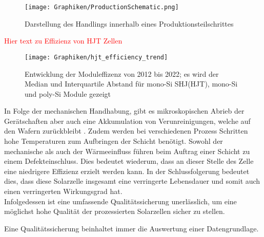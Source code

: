  
 \begin{figure}[h!]
     \centering
     \texttt{[image: Graphiken/ProductionSchematic.png]}
     \caption{Darstellung des Handlings innerhalb eines Produktionsteilschrittes }
     \label{fig:prodSchematic}
 \end{figure}

\textcolor{red}{Hier text zu Effizienz von HJT Zellen}

\begin{figure}[h!]
	\centering
	\texttt{[image: Graphiken/hjt\_efficiency\_trend]}
	\caption{Entwicklung der Moduleffizenz von 2012 bis 2022; es wird der Median und Interquartile Abstand für mono-Si SHJ(HJT), mono-Si und poly-Si Module gezeigt \cite{hjttrendKräling2022}}
	\label{fig:hjtefficiencytrend}
\end{figure}

In Folge der mechanischen Handhabung, gibt es mikroskopischen Abrieb der Gerätschaften aber auch eine Akkumulation von Verunreinigungen, welche auf den Wafern zurückbleibt\cite{Fischer.2019} \cite{Fischer.2022} \cite{particle_image_Fischer2019}. Zudem werden bei verschiedenen Prozess Schritten hohe Temperaturen zum Aufbringen der Schicht benötigt. Sowohl der mechanische als auch der Wärmeeinfluss führen beim Auftrag einer Schicht zu einem Defekteinschluss. Dies bedeutet wiederum, dass an dieser Stelle des Zelle eine niedrigere Effizienz erzielt werden kann. In der Schlussfolgerung bedeutet dies, dass diese Solarzelle insgesamt eine verringerte Lebensdauer und somit auch einen verringerten Wirkungsgrad hat.\cite{Fischer.2019b} \\ 
Infolgedessen ist eine umfassende Qualitätssicherung unerlässlich, um eine möglichst hohe Qualität der prozessierten Solarzellen sicher zu stellen. 


Eine Qualitätssicherung beinhaltet immer die Auswertung einer Datengrundlage.

